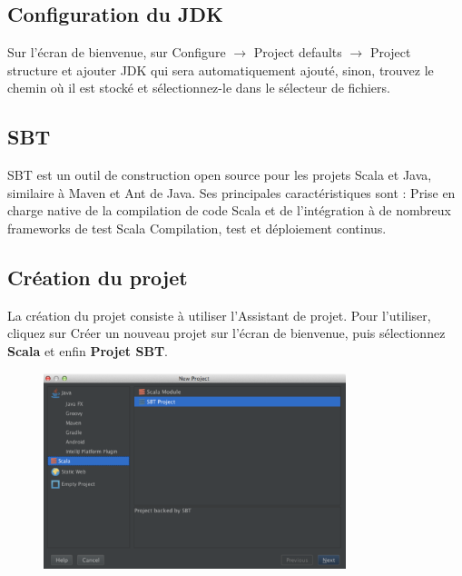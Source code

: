 \documentclass[12pt]{article}
\begin{document}
\subsection{Configuration du JDK}


Sur l’écran de bienvenue, sur \textcolor[HTML]{373A3C}{Configure $ \rightarrow $  Project defaults $ \rightarrow $  Project structure et ajouter JDK qui sera automatiquement ajouté, sinon, trouvez le chemin où il est stocké et sélectionnez-le dans le sélecteur de fichiers.}\par

\subsection{SBT}

\textcolor[HTML]{222222}{SBT est un outil de construction open source pour les projets Scala et Java, similaire à Maven et Ant de Java. Ses principales caractéristiques sont : Prise en charge native de la compilation de code Scala et de l'intégration à de nombreux frameworks de test Scala Compilation, test et déploiement continus.}\par

\subsection{Création du projet}

La création du projet consiste à utiliser l’Assistant de projet. Pour l'utiliser, cliquez sur Créer un nouveau projet sur l'écran de bienvenue, puis sélectionnez \textbf{Scala} et enfin \textbf{Projet SBT}.\par




\begin{figure}[H]
	\begin{Center}
		\includegraphics[width=3.47in,height=2.24in]{./media/image2.png}
	\end{Center}
\end{figure}
\end{document}
